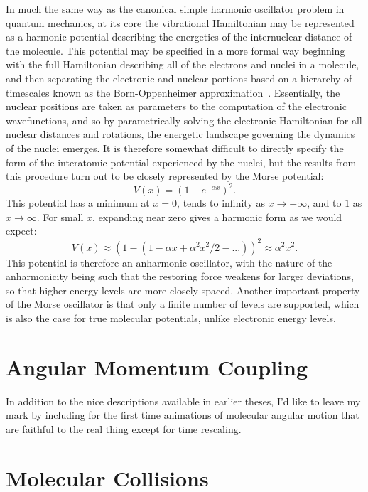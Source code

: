 In much the same way as the canonical simple harmonic oscillator problem in quantum mechanics, at its core the vibrational Hamiltonian may be represented as a harmonic potential describing the energetics of the internuclear distance of the molecule.
This potential may be specified in a more formal way beginning with the full Hamiltonian describing all of the electrons and nuclei in a molecule, and then separating the electronic and nuclear portions based on a hierarchy of timescales known as the Born-Oppenheimer approximation~\citep[Sec.~8.1]{Atkins2005}.
Essentially, the nuclear positions are taken as parameters to the computation of the electronic wavefunctions, and so by parametrically solving the electronic Hamiltonian for all nuclear distances and rotations, the energetic landscape governing the dynamics of the nuclei emerges.
It is therefore somewhat difficult to directly specify the form of the interatomic potential experienced by the nuclei, but the results from this procedure turn out to be closely represented by the Morse potential:
\begin{equation}
V(x) = \left(1-e^{-\alpha x}\right)^2.
\end{equation}
This potential has a minimum at $x=0$, tends to infinity as $x\rightarrow-\infty$, and to $1$ as $x\rightarrow\infty$. For small $x$, expanding near zero gives a harmonic form as we would expect:
\begin{equation}
V(x) \approx \left(1-(1-\alpha x + \alpha^2 x^2 / 2 - ...)\right)^2 \approx \alpha^2 x^2.
\end{equation}
This potential is therefore an anharmonic oscillator, with the nature of the anharmonicity being such that the restoring force weakens for larger deviations, so that higher energy levels are more closely spaced.
Another important property of the Morse oscillator is that only a finite number of levels are supported, which is also the case for true molecular potentials, unlike electronic energy levels.


\section{Angular Momentum Coupling}

In addition to the nice descriptions available in earlier theses, I'd like to leave my mark by including for the first time animations of molecular angular motion that are faithful to the real thing except for time rescaling.


\section{Molecular Collisions}



\ifx\justbeingincluded\undefined

\fi